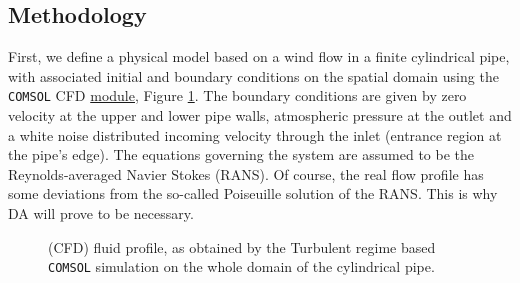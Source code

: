 \documentclass{article}
\theoremstyle{definition}
\theoremstyle{definition}
\theoremstyle{remark}
\theoremstyle{mythmstyle}
\begin{document}
\subsection{Methodology}

First, we define a physical model based on a wind flow in a finite cylindrical pipe, with associated initial and boundary conditions on the spatial domain using the \texttt{COMSOL} CFD \hyperlink{https://www.comsol.com/cfd-module}{module}, Figure \ref{fig:flow}. The boundary conditions are given by zero velocity at the upper and lower pipe walls, atmospheric pressure at the outlet and a white noise distributed incoming velocity through the inlet (entrance region at the pipe's edge). The equations governing the system are assumed to be the Reynolds-averaged Navier Stokes (RANS). Of course, the real flow profile has some deviations from the so-called Poiseuille solution of the RANS. This is why DA will prove to be necessary.

\begin{figure}[!ht]
  \centering
  \caption{(CFD) fluid profile, as obtained by the Turbulent regime based \texttt{COMSOL} simulation on the whole domain of the cylindrical pipe.}
  \label{fig:flow}
\end{figure}
\end{document}
